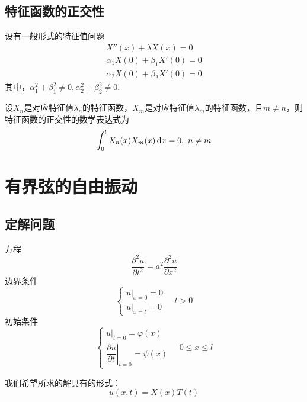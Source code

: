 \subsection{特征函数的正交性}

\ttheorem[特征函数的正交性]
设有一般形式的特征值问题
\begin{align*}
	X''(x) + \lambda X(x) = 0\\
	\alpha_1 X(0) + \beta_1 X'(0) = 0\\
	\alpha_2 X(0) + \beta_2 X'(0) = 0
\end{align*}
其中，$\alpha_1^2 + \beta_1^2 \neq 0, \alpha_2^2 + \beta_2^2 \neq 0.$

设$X_n$是对应特征值$\lambda_n$的特征函数，$X_m$是对应特征值$\lambda_m$的特征函数，且$m \neq n$，则特征函数的正交性的数学表达式为
\begin{align}
	\int_0^l X_n(x)X_m(x) \, {\rm{d}} x =0, \,\, n \neq m
\end{align}

\section{有界弦的自由振动}
\subsection{定解问题}
\noindent 方程
\begin{equation}
	\dfrac{\partial^2 u}{\partial t^2} = a^2 \dfrac{\partial^2 u}{\partial x^2}
	\label{定解1}
\end{equation}
边界条件
\begin{equation}
	\begin{cases}
		\left. u \right|_{x = 0} = 0\\
		\left. u \right|_{x = l} = 0
	\end{cases}
	\quad t > 0
\end{equation}
初始条件
\begin{equation}
	\begin{cases}
		\left. u \right|_{t = 0} = \varphi(x)\\[0.5em]
		\left. \dfrac{\partial u}{\partial t} \right|_{t = 0} = \psi(x)
	\end{cases}
\quad 0 \le x \le l
\end{equation}

\noindent 我们希望所求的解具有的形式：
\begin{equation}
	u(x, t) = X(x)T(t)
\end{equation}

